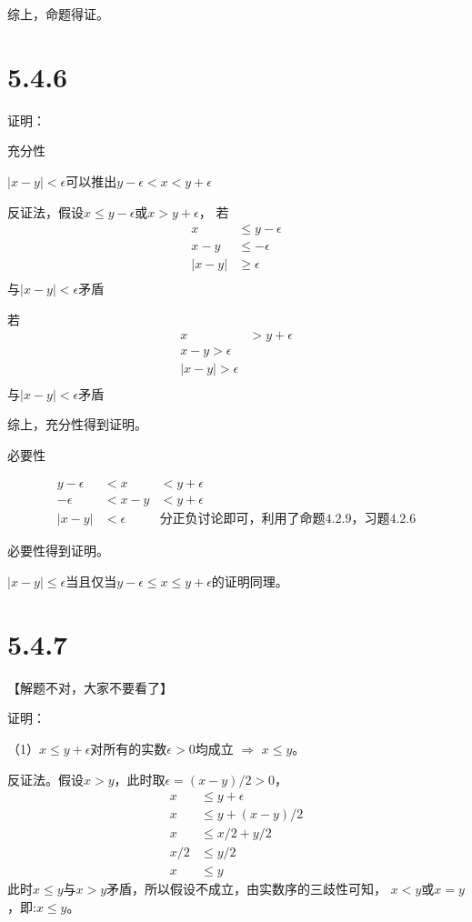 \documentclass{article}
\theoremstyle{mystyle}
\begin{document}
综上，命题得证。

\section*{5.4.6}

证明：

充分性

$|x-y| < \epsilon $可以推出$y - \epsilon < x < y + \epsilon$

反证法，假设$x \leq y - \epsilon$或$x > y + \epsilon$，
若
\begin{align*}
  x     & \leq y - \epsilon \\
  x - y & \leq - \epsilon   \\
  |x-y| & \geq \epsilon     \\
\end{align*}
与$|x-y| < \epsilon$矛盾

若
\begin{align*}
  x & > y + \epsilon \\
  x - y > \epsilon   \\
  |x - y| > \epsilon \\
\end{align*}
与$|x-y| < \epsilon$矛盾

综上，充分性得到证明。

必要性

\begin{align*}
  y - \epsilon & < x        & < y + \epsilon                    \\
  -\epsilon    & < x - y    & < y + \epsilon                    \\
  |x - y|      & < \epsilon & \text{分正负讨论即可，利用了命题4.2.9，习题4.2.6}
\end{align*}

必要性得到证明。

$|x-y| \leq \epsilon$当且仅当$y-\epsilon \leq x \leq y + \epsilon$的证明同理。

\section*{5.4.7}

【解题不对，大家不要看了】

证明：

（1）$x \leq y + \epsilon$对所有的实数$\epsilon > 0$均成立 $\Rightarrow$ $x \leq y$。

反证法。假设$x > y$，此时取$\epsilon = (x-y)/2 > 0$，
\begin{align*}
  x   & \leq y + \epsilon    \\
  x   & \leq y + (x - y) / 2 \\
  x   & \leq x/2 + y/2       \\
  x/2 & \leq y/2             \\
  x   & \leq y
\end{align*}
此时$x \leq y$与$x > y$矛盾，所以假设不成立，由实数序的三歧性可知，
$x < y$或$x = y$，即:$x \leq y$。
\end{document}
